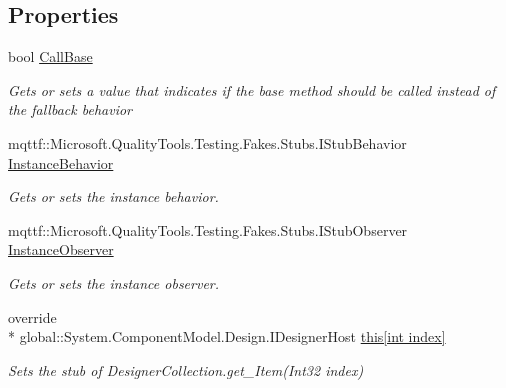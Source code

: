\subsection*{Properties}
\begin{DoxyCompactItemize}
\item 
bool \hyperlink{class_system_1_1_component_model_1_1_design_1_1_fakes_1_1_stub_designer_collection_a4990a2c7ed40674da7371fa581ddd994}{Call\-Base}
\begin{DoxyCompactList}\small\item\em Gets or sets a value that indicates if the base method should be called instead of the fallback behavior\end{DoxyCompactList}\item 
mqttf\-::\-Microsoft.\-Quality\-Tools.\-Testing.\-Fakes.\-Stubs.\-I\-Stub\-Behavior \hyperlink{class_system_1_1_component_model_1_1_design_1_1_fakes_1_1_stub_designer_collection_a2330fcd06602f8375a79f522ff748c9f}{Instance\-Behavior}
\begin{DoxyCompactList}\small\item\em Gets or sets the instance behavior.\end{DoxyCompactList}\item 
mqttf\-::\-Microsoft.\-Quality\-Tools.\-Testing.\-Fakes.\-Stubs.\-I\-Stub\-Observer \hyperlink{class_system_1_1_component_model_1_1_design_1_1_fakes_1_1_stub_designer_collection_afd47350c0b37268c343f4cf79f105233}{Instance\-Observer}
\begin{DoxyCompactList}\small\item\em Gets or sets the instance observer.\end{DoxyCompactList}\item 
override \\*
global\-::\-System.\-Component\-Model.\-Design.\-I\-Designer\-Host \hyperlink{class_system_1_1_component_model_1_1_design_1_1_fakes_1_1_stub_designer_collection_a33fd911e968d5dd075f0dd6462263aaa}{this\mbox{[}int index\mbox{]}}
\begin{DoxyCompactList}\small\item\em Sets the stub of Designer\-Collection.\-get\-\_\-\-Item(\-Int32 index)\end{DoxyCompactList}\end{DoxyCompactItemize}


